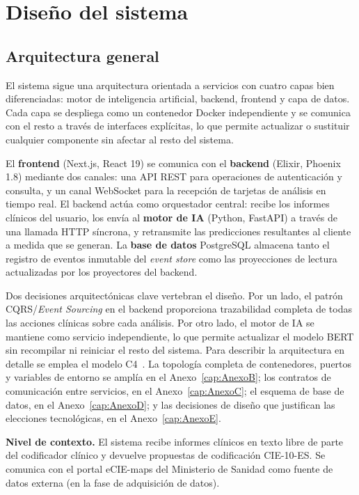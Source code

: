\section{Diseño del sistema}

\subsection{Arquitectura general}

El sistema sigue una arquitectura orientada a servicios con cuatro capas bien diferenciadas: motor de inteligencia artificial, backend, frontend y capa de datos. Cada capa se despliega como un contenedor Docker independiente y se comunica con el resto a través de interfaces explícitas, lo que permite actualizar o sustituir cualquier componente sin afectar al resto del sistema.

El \textbf{frontend} (Next.js, React 19) se comunica con el \textbf{backend} (Elixir, Phoenix 1.8) mediante dos canales: una API REST para operaciones de autenticación y consulta, y un canal WebSocket para la recepción de tarjetas de análisis en tiempo real. El backend actúa como orquestador central: recibe los informes clínicos del usuario, los envía al \textbf{motor de IA} (Python, FastAPI) a través de una llamada HTTP síncrona, y retransmite las predicciones resultantes al cliente a medida que se generan. La \textbf{base de datos} PostgreSQL almacena tanto el registro de eventos inmutable del \emph{event store} como las proyecciones de lectura actualizadas por los proyectores del backend.

Dos decisiones arquitectónicas clave vertebran el diseño. Por un lado, el patrón CQRS/\emph{Event Sourcing} en el backend proporciona trazabilidad completa de todas las acciones clínicas sobre cada análisis. Por otro lado, el motor de IA se mantiene como servicio independiente, lo que permite actualizar el modelo BERT sin recompilar ni reiniciar el resto del sistema. Para describir la arquitectura en detalle se emplea el modelo C4~\cite{Brown22}. La topología completa de contenedores, puertos y variables de entorno se amplía en el Anexo~\ref{cap:AnexoB}; los contratos de comunicación entre servicios, en el Anexo~\ref{cap:AnexoC}; el esquema de base de datos, en el Anexo~\ref{cap:AnexoD}; y las decisiones de diseño que justifican las elecciones tecnológicas, en el Anexo~\ref{cap:AnexoE}.

\textbf{Nivel de contexto.} El sistema recibe informes clínicos en texto libre de parte del codificador clínico y devuelve propuestas de codificación CIE-10-ES. Se comunica con el portal eCIE-maps del Ministerio de Sanidad como fuente de datos externa (en la fase de adquisición de datos).

